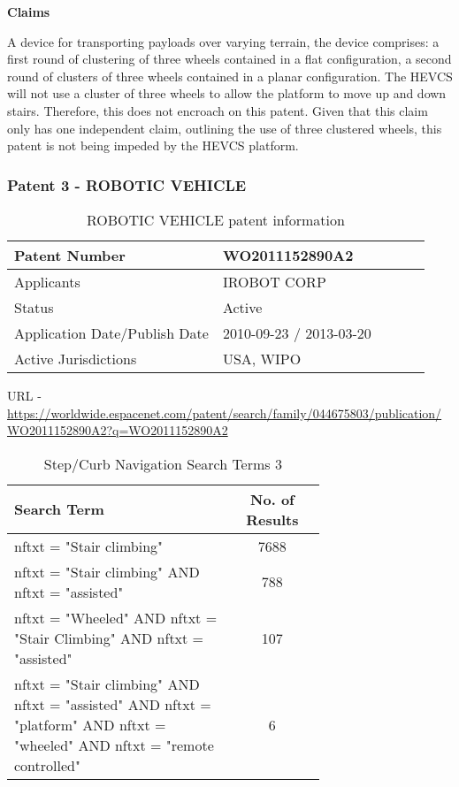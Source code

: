 \documentclass [12pt]{article}
\begin{document}
\textbf{Claims}

A device for transporting payloads over varying terrain, the device comprises: a first round of clustering of three wheels contained in a flat configuration, a second round of clusters of three wheels contained in a planar configuration.
The HEVCS will not use a cluster of three wheels to allow the platform to move up and down stairs. Therefore, this does not encroach on this patent.
Given that this claim only has one independent claim, outlining the use of three clustered wheels, this patent is not being impeded by the HEVCS platform.

\subsubsection{Patent 3 - ROBOTIC VEHICLE}

\begin{table}[H]
    \centering
    \setlength{\arrayrulewidth}{1.5pt}
    \begin{tabular}{|p{0.5\linewidth}|p{0.5\linewidth}|}
    \hline
    Patent Number & WO2011152890A2\\
    \hline
    Applicants & IROBOT CORP\\
    \hline
    Status & Active\\
    \hline
    Application Date/Publish Date & 2010-09-23 / 2013-03-20\\
    \hline
    Active Jurisdictions & USA, WIPO\\
    \hline
    \end{tabular}
    \caption{ROBOTIC VEHICLE patent information}
    \label{table:robotic_vehicle_patent_information}
\end{table}

URL - \url{https://worldwide.espacenet.com/patent/search/family/044675803/publication/WO2011152890A2?q=WO2011152890A2}

\begin{table}[H]
    \centering
    \setlength{\arrayrulewidth}{1.5pt}
    \begin{tabular}{|p{0.7\linewidth}|c|}
    \hline
    \cellcolor{gray!40}Search Term & \cellcolor{gray!40}No. of Results \\
    \hline
    nftxt = "Stair climbing" & 7688 \\
    \hline
    nftxt = "Stair climbing" AND nftxt = "assisted" & 788 \\
    \hline
    nftxt = "Wheeled" AND nftxt = "Stair Climbing" AND nftxt = "assisted" & 107 \\
    \hline
    nftxt = "Stair climbing" AND nftxt = "assisted" AND nftxt = "platform" AND nftxt = "wheeled" AND nftxt = "remote controlled"& 6 \\
    \hline
    \end{tabular}
    \caption{Step/Curb Navigation Search Terms 3}
    \label{table:step_curb_nav_st_3}
\end{table}
\end{document}
